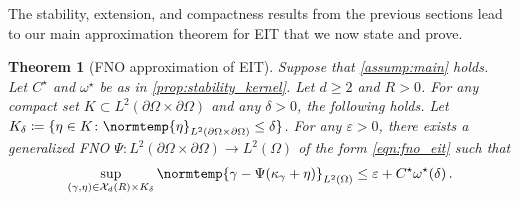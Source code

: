 \documentclass[pdflatex,sn-mathphys-num]{sn-jnl-preprint}
\newcommand{\cX}{\mathcal{X}}
\newcommand{\pOmega}{{\partial\Omega}}
\newcommand{\norm}{\normtemp}
\newcommand{\defeq}{\coloneqq} %
\newcommand{\ep}{\varepsilon}
\theoremstyle{thmstyleone}%
\newtheorem{theorem}{Theorem}[section]%
\theoremstyle{thmstyletwo}%
\theoremstyle{thmstylethree}%
\numberwithin{equation}{section}
\numberwithin{theorem}{section}
\begin{document}
The stability, extension, and compactness results from the previous sections lead to our main approximation theorem for EIT that we now state and prove.
\begin{theorem}[FNO approximation of EIT]\label{thm:fno_approx_main}
    Suppose that \cref{assump:main} holds. Let $C^\star$ and $\omega^\star$ be as in \cref{prop:stability_kernel}. Let $d\geq 2$ and $R>0$. For any compact set  $K \subset L^2(\pOmega\times\pOmega)$ and any $\delta>0$, the following holds. Let $K_\delta\defeq{\{\eta\in K\colon \norm{\eta}_{L^2(\pOmega\times\pOmega)}\leq \delta\}}$. For any $\ep>0$, there exists a generalized FNO $\Psi \colon L^2(\pOmega\times\pOmega)\to L^2(\Omega)$ of the form \eqref{eqn:fno_eit} such that
    \begin{align}\label{eqn:fno_approx_main}
        \sup_{(\gamma,\eta)\in \cX_d(R)\times K_\delta} \norm{\gamma - \Psi(\kappa_\gamma + \eta)}_{L^2(\Omega)} \leq  \ep + C^\star\omega^\star(\delta)\,.
    \end{align}
\end{theorem}
\end{document}
